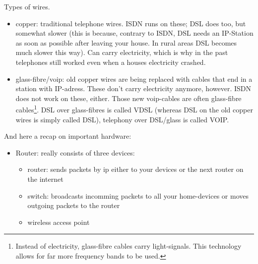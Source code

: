 Types of wires.
\begin{itemize}
    \item copper: traditional telephone wires. ISDN runs on these; DSL does too, but somewhat slower (this is because, contrary to ISDN, DSL needs an IP-Station as soon as possible after leaving your house. In rural areas DSL becomes much slower this way). Can carry electricity, which is why in the past telephones still worked even when a houses electricity crashed. 
    \item glass-fibre/voip: old copper wires are being replaced with cables that end in a station with IP-adress. These don't carry electricity anymore, however. ISDN does not work on these, either. Those new voip-cables are often glass-fibre cables\footnote{Instead of electricity, glass-fibre cables carry light-signals. This technology allows for far more frequency bands to be used.}. DSL over glass-fibres is called VDSL (whereas DSL on the old copper wires is simply called DSL), telephony over DSL/glass is called VOIP.
\end{itemize}

And here a recap on important hardware: 
\begin{itemize}
    \item Router: really consists of three devices: 
        \begin{itemize} 
            \item router: sends packets by ip either to your devices or the next router on the internet
            \item switch: broadcasts incomming packets to all your home-devices or moves outgoing packets to the router
            \item wireless access point
        \end{itemize}
\end{itemize}


